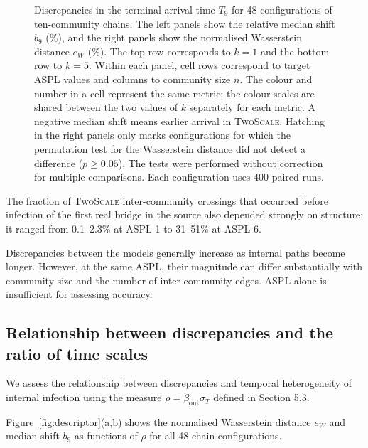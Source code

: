 \documentclass[a4paper,fleqn]{cas-sc}
\newcommand{\TS}{\textup{\textsc{TwoScale}}}
\newcommand{\eW}{e_{W}}
\begin{document}
\begin{figure}[tbp]
\caption{%
Discrepancies in the terminal arrival time $T_9$ for 48 configurations of ten-community chains.
The left panels show the relative median shift $b_9$ (\%), and the right panels show the normalised Wasserstein distance $\eW$ (\%). The top row corresponds to $k=1$ and the bottom row to $k=5$.
Within each panel, cell rows correspond to target ASPL values and columns to community size $n$.
The colour and number in a cell represent the same metric; the colour scales are shared between the two values of $k$ separately for each metric.
A negative median shift means earlier arrival in \TS{}.
Hatching in the right panels only marks configurations for which the permutation test for the Wasserstein distance did not detect a difference ($p\geq0.05$).
The tests were performed without correction for multiple comparisons.
Each configuration uses 400 paired runs.
}
\label{fig:accuracy_map}
\end{figure}

The fraction of \TS{} inter-community crossings that occurred before infection of the first real bridge in the source also depended strongly on structure: it ranged from 0.1--2.3\% at ASPL 1 to 31--51\% at ASPL 6.

Discrepancies between the models generally increase as internal paths become longer. However, at the same ASPL, their magnitude can differ substantially with community size and the number of inter-community edges. ASPL alone is insufficient for assessing accuracy.


\subsection{Relationship between discrepancies and the ratio of time scales}
\label{sec:res_descriptor}

We assess the relationship between discrepancies and temporal heterogeneity of internal infection using the measure $\rho=\beta_{\mathrm{out}}\sigma_T$ defined in Section 5.3.

Figure~\ref{fig:descriptor}(a,b) shows the normalised Wasserstein distance $\eW$ and median shift $b_9$ as functions of $\rho$ for all 48 chain configurations.
\end{document}
